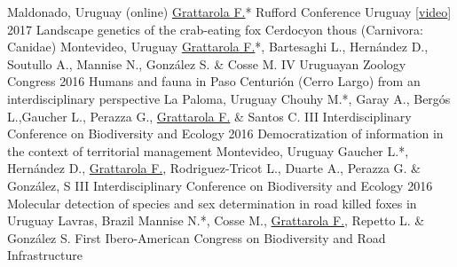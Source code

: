 \documentclass[9pt]{developercv} %
\begin{document}
\begin{entrylist}
		{Maldonado, Uruguay (online)}
		{\underline{Grattarola F.}* \slashsep Rufford Conference Uruguay  [\href{https://youtu.be/3_lM-gPNLWY}{video}]}
	\entrylong
		{2017}
		{Landscape genetics of the crab-eating fox Cerdocyon thous (Carnivora: Canidae)}
		{Montevideo, Uruguay}
		{\underline{Grattarola F.}*, Bartesaghi L., Hernández D., Soutullo A., Mannise N., González S. \& Cosse M. \slashsep IV Uruguayan Zoology Congress}
	\entrylong
		{2016}
		{Humans and fauna in Paso Centurión (Cerro Largo) from an interdisciplinary perspective}
		{La Paloma, Uruguay}
		{Chouhy M.*, Garay A., Bergós L.,Gaucher L., Perazza G., \underline{Grattarola F.} \& Santos C. \slashsep III Interdisciplinary Conference on Biodiversity and Ecology}
	\entrylong
		{2016}
		{Democratization of information in the context of territorial management}
		{Montevideo, Uruguay}
		{Gaucher L.*, Hernández D., \underline{Grattarola F.}, Rodriguez-Tricot L., Duarte A., Perazza G. \& González, S \slashsep III Interdisciplinary Conference on Biodiversity and Ecology}
	\entrylong
		{2016}
		{Molecular detection of species and sex determination in road killed foxes in Uruguay}
		{Lavras, Brazil}
		{Mannise N.*, Cosse M., \underline{Grattarola F.}, Repetto L. \& González S. \slashsep First Ibero-American Congress on Biodiversity and Road Infrastructure}		
\end{entrylist}


\end{document}
